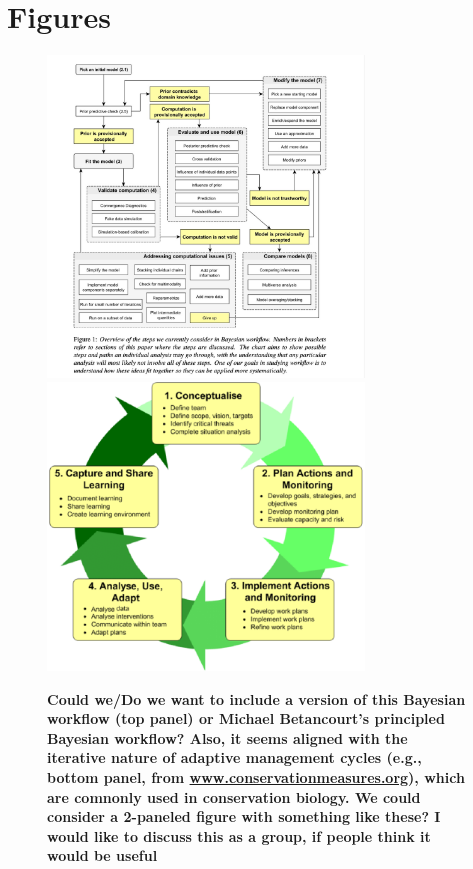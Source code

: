 \documentclass{article}
\begin{document}
\section* {Figures}
 \begin{figure}[h]
\centering
 \includegraphics[width=0.75\textwidth]{../figs/BayesianWorkflowfromGelman2020.jpg}
  \includegraphics[width=0.75\textwidth]{../figs/The-Open-Standards-adaptive-management-cycle-from-wwwconservationmeasuresorg.png}
 \caption{\textbf{Could we/Do we want to include a version of this Bayesian workflow \citep{gelman2020bayesian} (top panel) or Michael Betancourt's principled Bayesian workflow? Also, it seems aligned with the iterative nature of adaptive management cycles (e.g., bottom panel, from \href{www.conservationmeasures.org}{www.conservationmeasures.org}), which are comnonly used in conservation biology. We could consider a 2-paneled figure with something like these? I would like to discuss this as a group, if people think it would be useful}} 
 \label{fig:workflow}
 \end{figure}
\end{document}
